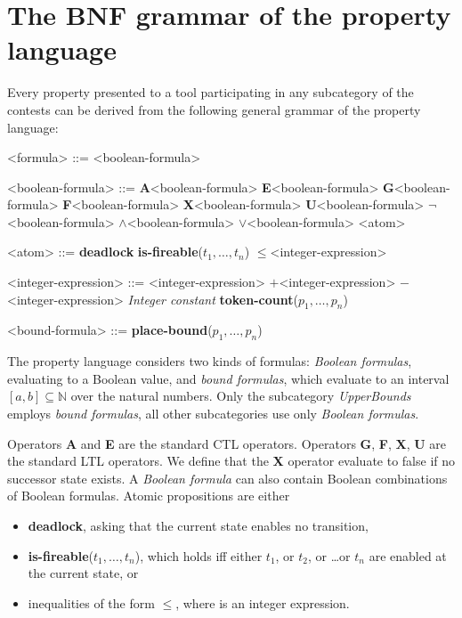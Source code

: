 \documentclass[10pt,english,a4paper]{article}
\newcommand\N                {\mathbb{N}}
\newcommand\ctla             {\textbf{A}\xspace}
\newcommand\ctle             {\textbf{E}\xspace}
\newcommand\ltlf             {\textbf{F}\xspace}
\newcommand\ltlg             {\textbf{G}\xspace}
\newcommand\ltlx             {\textbf{X}\xspace}
\newcommand\ltlu             {\textbf{U}\xspace}
\newcommand\logicnot         {\boldmath$\lnot$\xspace}
\newcommand\logicand         {\boldmath$\land$\xspace}
\newcommand\logicor          {\boldmath$\lor$\xspace}
\newcommand\atomleq          {\boldmath$\leq$\xspace}
\newcommand\atomdead         {\textbf{deadlock}\xspace}
\newcommand\atomisfire[1]    {\textbf{is-fireable}(#1)}
\newcommand\atomplacebnd[1]  {\textbf{place-bound}(#1)}
\newcommand\atomtokenscnt[1] {\textbf{token-count}(#1)}
\newcommand\exprplus         {\boldmath$+$\xspace}
\newcommand\exprminus        {\boldmath$-$\xspace}
\begin{document}
\section{The BNF grammar of the property language}
\label{s:bnf}

Every property presented to a tool participating in any subcategory of the
contests can be derived from the following general grammar of the
property language:

\begin{grammar}
<formula> ::= <boolean-formula>

<boolean-formula> ::= \ctla <boolean-formula>
\alt \ctle <boolean-formula>
\alt \ltlg <boolean-formula>
\alt \ltlf <boolean-formula>
\alt \ltlx <boolean-formula>
 \ltlu <boolean-formula>
\alt \logicnot <boolean-formula>
 \logicand <boolean-formula>
 \logicor <boolean-formula>
\alt <atom>

<atom> ::= \atomdead
\alt \atomisfire{$t_1, \ldots, t_n$}
 \atomleq <integer-expression>

<integer-expression> ::=
     <integer-expression> \exprplus <integer-expression>
 \exprminus <integer-expression>
\alt \textit{Integer constant}
\alt \atomtokenscnt{$p_1, \ldots, p_n$}

<bound-formula> ::= \atomplacebnd{$p_1, \ldots, p_n$}

\end{grammar}

The property language considers two kinds of formulas:
\textit{Boolean formulas},
evaluating to a Boolean value, and \textit{bound formulas},
which evaluate to an interval $[a,b] \subseteq \N$ over the natural numbers.
Only the subcategory
\textit{UpperBounds} employs \textit{bound formulas}, all other
subcategories use only \textit{Boolean formulas}.

Operators \ctla and \ctle are the standard CTL operators.
Operators
\ltlg,
\ltlf,
\ltlx,
\ltlu
are the standard LTL operators.
We define that the \ltlx operator evaluate to false if no successor state
exists.  A \textit{Boolean formula} can also contain Boolean combinations of Boolean
formulas.
Atomic propositions are either
\begin{itemize}
\item
  \atomdead, asking that the current state enables no transition,
\item
  \atomisfire{$t_1, \ldots, t_n$}, which holds iff either $t_1$, or $t_2$,
  or \ldots or $t_n$ are enabled at the current state, or
\item
  inequalities of the form  \atomleq {},
  where  is an integer expression.
\end{itemize}
\end{document}
